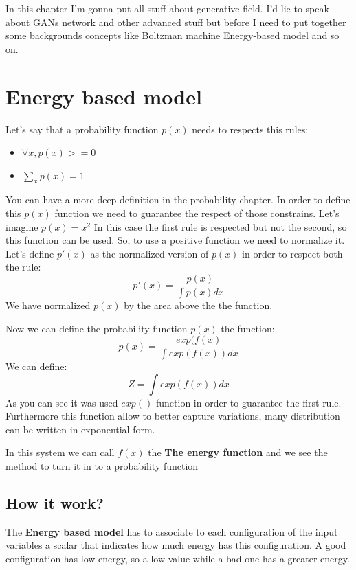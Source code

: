 In this chapter I'm gonna put all stuff about generative field. I'd lie to speak about GANs network and other advanced stuff but before I need to put together some backgrounds concepts like Boltzman machine Energy-based model and so on. 

\section{Energy based model}
Let's say that a probability function $p(x)$ needs to respects this rules:
\begin{itemize}
 \item $\forall x, p(x) >= 0$ 
 \item $\sum_x p(x) = 1$
 \end{itemize} 
 You can have a more deep definition in the probability chapter.
 In order to define this $p(x)$ function we need to guarantee the respect of those constrains. Let's imagine $p(x) = x^2$
 In this case the first rule is respected but not the second, so this function can be used. So, to use a positive function we need to normalize it. Let's define $p'(x)$ as the normalized version of $p(x)$ in order to respect both the rule:
 \begin{equation}
 p'(x) = \frac{p(x)}{\int p(x)dx}
 \end{equation}\label{normalizationfunctionforprobability}
 We have normalized $p(x)$ by the area above the the function.
 
 Now we can define  the probability function $p(x)$ the function:
 \begin{equation}
 p(x) = \frac{exp(f(x)}{\int exp(f(x))dx}
 \end{equation}
 We can define:
 \begin{equation}
 Z = \int exp(f(x))dx
 \end{equation}
 As you can see it was used $exp()$ function in order to guarantee the first rule. Furthermore this function allow to better capture variations, many distribution can be written in exponential form.
 
 In this system we can call $f(x)$ the \textbf{The energy function} and we see the method to turn it in to a probability function
 
\subsection{How it work?}
 The \textbf{Energy based model} has to associate to each configuration of the input variables a scalar that indicates how much energy has this configuration. A good configuration has low energy, so a low value while a bad one has a greater energy.
 
